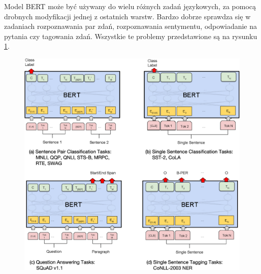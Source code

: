 Model BERT może być używany do wielu różnych zadań językowych, za pomocą drobnych modyfikacji jednej z ostatnich warstw. Bardzo dobrze sprawdza się w zadaniach rozpoznawania par zdań, rozpoznawania sentymentu, odpowiadanie na pytania czy tagowania zdań. Wszystkie te problemy przedstawione są na rysunku \ref{rys:bert_problems}.

\begin{figure}[t]
\centering\includegraphics[width=12cm]{figures/bert_problems.png}
\label{rys:bert_problems}
\end{figure}